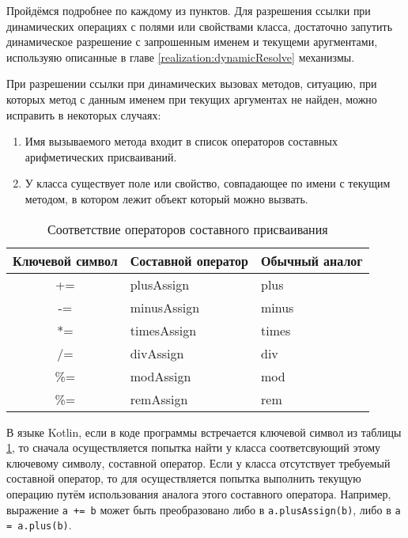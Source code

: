 Пройдёмся подробнее по каждому из пунктов. Для разрешения ссылки при динамических операциях с полями или свойствами класса, достаточно запутить динамическое разрешение с запрошенным именем и текущеми аругментами, используяю описанные в главе \ref{realization:dynamicResolve} механизмы.

При разрешении ссылки при динамических вызовах методов, ситуацию, при которых метод с данным именем при текущих аргументах не найден, можно исправить в некоторых случаях:

\begin{enumerate}
    \item Имя вызываемого метода входит в список операторов составных арифметических присваиваний.
    \item У класса существует поле или свойство, совпадающее по имени с текущим методом, в котором лежит объект который можно вызвать.
\end{enumerate}


\begin{table}[h]
\caption{\label{tab:compoundAssignment}Соответствие операторов составного присваивания}
\begin{center}
\begin{tabular}{|c|l|l|}
\hline
Ключевой символ & Составной оператор	& Обычный аналог \\
\hline
+=  & plusAssign             & plus   \\
-=  & minusAssign            & minus  \\
*=  & timesAssign            & times  \\
/=  & divAssign              & div    \\
\%= & modAssign              & mod    \\
\%= & remAssign\footnotemark & rem\footnotemark[\value{footnote}]   \\
\hline
\end{tabular}
\end{center}
\end{table} 


В языке Kotlin, если в коде программы встречается ключевой символ из таблицы \ref{tab:compoundAssignment}, то сначала осуществляется попытка найти у класса соответсвующий этому ключевому символу, составной оператор. Если у класса отсутствует требуемый составной оператор, то для осуществляется попытка выполнить текущую операцию путём использования аналога этого составного оператора. Например, выражение \texttt{a += b} может быть преобразовано либо в \texttt{a.plusAssign(b)}, либо в \texttt{a = a.plus(b)}. 

